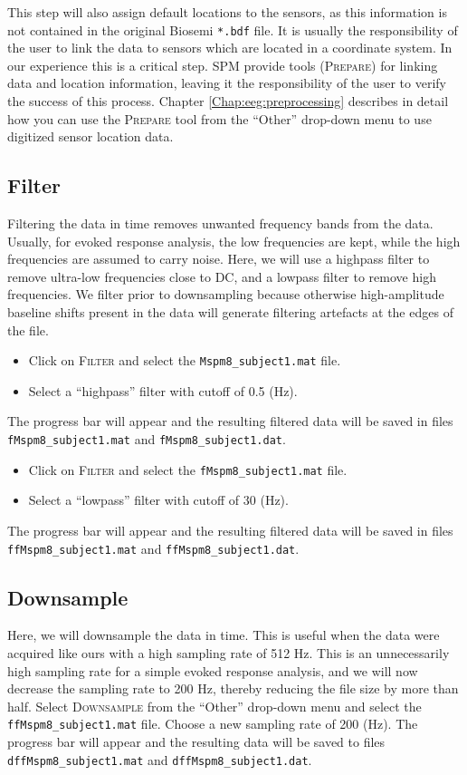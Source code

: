 This step will also assign default locations to the sensors, as this information is not contained in the original Biosemi \texttt{*.bdf} file. It is usually the responsibility of the user to link the data to sensors which are located in a coordinate system. In our experience this is a critical step. SPM provide tools (\textsc{Prepare}) for linking data and location information, leaving it the responsibility of the user to verify the success of this process. Chapter \ref{Chap:eeg:preprocessing} describes in detail how you can use the \textsc{Prepare} tool from the ``Other'' drop-down menu to use digitized sensor location data.


\subsection{Filter}
Filtering the data in time removes unwanted frequency bands from the data. Usually, for evoked response analysis, the low frequencies are kept, while the high frequencies are assumed to carry noise. Here, we will use a highpass filter to remove ultra-low frequencies close to DC, and a lowpass filter to remove high frequencies. We filter prior to downsampling because otherwise high-amplitude baseline shifts present in the data will generate filtering artefacts at the edges of the file. 
\begin{itemize}
\item{Click on \textsc{Filter} and select the \texttt{Mspm8\_subject1.mat} file.}
\item{Select a ``highpass'' filter with cutoff of 0.5 (Hz).}
\end{itemize}
The progress bar will appear and the resulting filtered data will be saved in files \texttt{fMspm8\_subject1.mat} and \texttt{fMspm8\_subject1.dat}. 
\begin{itemize}
\item{Click on \textsc{Filter} and select the \texttt{fMspm8\_subject1.mat} file.}
\item{Select a ``lowpass'' filter with cutoff of 30 (Hz).}
\end{itemize}
The progress bar will appear and the resulting filtered data will be saved in files \texttt{ffMspm8\_subject1.mat} and \texttt{ffMspm8\_subject1.dat}. 

\subsection{Downsample}
Here, we will downsample the data in time. This is useful when the data were acquired like ours with a high sampling rate of 512 Hz. This is an unnecessarily high sampling rate for a simple evoked response analysis, and we will now decrease the sampling rate to 200 Hz, thereby reducing the file size by more than half. Select \textsc{Downsample} from the ``Other'' drop-down menu and select the \texttt{ffMspm8\_subject1.mat} file. Choose a new sampling rate of 200 (Hz). The progress bar will appear and the resulting data will be saved to files \texttt{dffMspm8\_subject1.mat} and \texttt{dffMspm8\_subject1.dat}.

